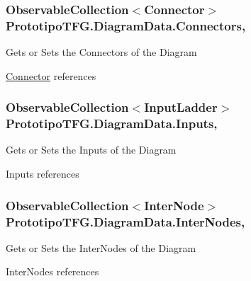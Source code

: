 \subsubsection[{Connectors}]{\setlength{\rightskip}{0pt plus 5cm}Observable\+Collection$<${\bf Connector}$>$ Prototipo\+T\+F\+G.\+Diagram\+Data.\+Connectors\hspace{0.3cm}{\ttfamily [get]}, {\ttfamily [set]}}\label{class_prototipo_t_f_g_1_1_diagram_data_a6928a8a58cf692d8ab07efb182fb6796}


Gets or Sets the Connectors of the Diagram 

\hyperlink{class_prototipo_t_f_g_1_1_connector}{Connector} references\hypertarget{class_prototipo_t_f_g_1_1_diagram_data_a4163f7d53233b49ac0c6e4603a9c7e77}{}
\subsubsection[{Inputs}]{\setlength{\rightskip}{0pt plus 5cm}Observable\+Collection$<${\bf Input\+Ladder}$>$ Prototipo\+T\+F\+G.\+Diagram\+Data.\+Inputs\hspace{0.3cm}{\ttfamily [get]}, {\ttfamily [set]}}\label{class_prototipo_t_f_g_1_1_diagram_data_a4163f7d53233b49ac0c6e4603a9c7e77}


Gets or Sets the Inputs of the Diagram 

Inputs references\hypertarget{class_prototipo_t_f_g_1_1_diagram_data_a26f7e4e03732de44df9d8f8a07466f41}{}
\subsubsection[{Inter\+Nodes}]{\setlength{\rightskip}{0pt plus 5cm}Observable\+Collection$<${\bf Inter\+Node}$>$ Prototipo\+T\+F\+G.\+Diagram\+Data.\+Inter\+Nodes\hspace{0.3cm}{\ttfamily [get]}, {\ttfamily [set]}}\label{class_prototipo_t_f_g_1_1_diagram_data_a26f7e4e03732de44df9d8f8a07466f41}


Gets or Sets the Inter\+Nodes of the Diagram 

Inter\+Nodes references\hypertarget{class_prototipo_t_f_g_1_1_diagram_data_a38c2bb132b0998e9794dc8cd43e80784}{}
